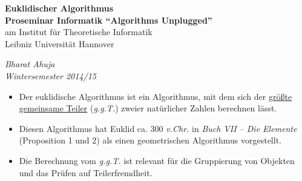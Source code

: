\documentclass[12pt]{article}
\begin{document}
\begin{center}
\textbf{Euklidischer Algorithmus\\}
\textbf{Proseminar Informatik ``Algorithms Unplugged''}\\
am Institut f\"ur Theoretische Informatik\\
Leibniz Universit\"at Hannover\\
\end{center}
\begin{flushright}
\textit{Bharat Ahuja\\Wintersemester 2014/15}
\end{flushright}

\noindent\makebox[\linewidth]{\rule{\paperwidth}{0.4pt}}
\vspace{10pt}
\begin{itemize}
	\item  Der euklidische Algorithmus ist ein Algorithmus, mit dem sich der \underline{gr\"o{\ss}te gemeinsame Teiler} (\textit{g.g.T.}) zweier nat\"urlicher Zahlen berechnen l\"asst. 
	\item Diesen Algorithmus hat Euklid ca. 300 \textit{v.Chr.} in \textit{Buch VII -- Die Elemente} (Proposition 1 und 2) als einen geometrischen Algorithmus vorgestellt.
	\item Die Berechnung vom \textit{g.g.T.} ist relevant f\"ur die Gruppierung von Objekten und das Pr\"ufen auf Teilerfremdheit.
 

\end{itemize}
\end{document}
